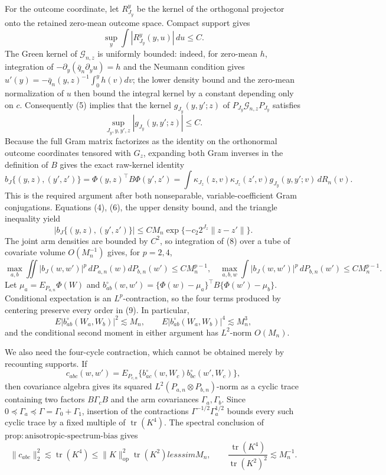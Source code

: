 For the outcome coordinate, let \(R^y_{J_y}\) be the kernel of the orthogonal projector onto the retained zero-mean outcome space.  Compact support gives
\[
\sup_y\int|R^y_{J_y}(y,u)|\,du\le C.
\tag{5}
\]
The Green kernel of \(\mathcal G_{n,z}\) is uniformly bounded: indeed, for zero-mean \(h\), integration of
\(-\partial_y(\bar q_n\partial_yu)=h\) and the Neumann condition gives
\(u'(y)=-\bar q_n(y,z)^{-1}\int_0^yh(v)dv\); the lower density bound and the zero-mean normalization of \(u\) then bound the integral kernel by a constant depending only on \(c\).  Consequently (5) implies that the kernel \(g_{J_y}(y,y';z)\) of \(P_{J_y}\mathcal G_{n,z}P_{J_y}\) satisfies
\[
\sup_{J_y,y,y',z}|g_{J_y}(y,y';z)|\le C.
\tag{6}
\]
Because the full Gram matrix factorizes as the identity on the orthonormal outcome coordinates tensored with \(G_z\), expanding both Gram inverses in the definition of \(B\) gives the exact raw-kernel identity
\[
b_J\{(y,z),(y',z')\}
=\Phi(y,z)^{\top}B\Phi(y',z')
=\int\kappa_{J_z}(z,v)\kappa_{J_z}(z',v)
g_{J_y}(y,y';v)\,dR_n(v).
\tag{7}
\]
This is the required argument after both nonseparable, variable-coefficient Gram conjugations.  Equations (4), (6), the upper density bound, and the triangle inequality yield
\[
|b_J\{(y,z),(y',z')\}|
\le C M_n\exp\{-c_2 2^{J_z}\|z-z'\|\}.
\tag{8}
\]
The joint arm densities are bounded by \(C^2\), so integration of (8) over a tube of covariate volume \(O(M_n^{-1})\) gives, for \(p=2,4\),
\[
\max_{a,b}\iint|b_J(w,w')|^p\,dP_{a,n}(w)dP_{b,n}(w')
\le C M_n^{p-1},
\quad
\max_{a,b,w}\int|b_J(w,w')|^p\,dP_{b,n}(w')
\le C M_n^{p-1}.
\tag{9}
\]
Let \(\mu_a=E_{P_{a,n}}\Phi(W)\) and
\(b_{ab}^{\circ}(w,w')=\{\Phi(w)-\mu_a\}^{\top}B\{\Phi(w')-\mu_b\}\).
Conditional expectation is an \(L^p\)-contraction, so the four terms produced by centering preserve every order in (9).  In particular,
\[
E|b_{ab}^{\circ}(W_a,W_b)|^2\lesssim M_n,
\qquad
E|b_{ab}^{\circ}(W_a,W_b)|^4\lesssim M_n^3,
\tag{10}
\]
and the conditional second moment in either argument has \(L^2\)-norm \(O(M_n)\).

We also need the four-cycle contraction, which cannot be obtained merely by recounting supports.  If
\[
c_{abc}(w,w')=E_{P_{c,n}}
\{b_{ac}^{\circ}(w,W_c)b_{bc}^{\circ}(w',W_c)\},
\]
then covariance algebra gives its squared \(L^2(P_{a,n}\otimes P_{b,n})\)-norm as a cyclic trace containing two factors \(B\Gamma_cB\) and the arm covariances \(\Gamma_a,\Gamma_b\).  Since \(0\preceq\Gamma_a\preceq\Gamma=\Gamma_0+\Gamma_1\), insertion of the contractions \(\Gamma^{-1/2}\Gamma_a^{1/2}\) bounds every such cyclic trace by a fixed multiple of \(\operatorname{tr}(K^4)\).  The spectral conclusion of \(\mathrm{prop{:}anisotropic\text{-}spectrum\text{-}bias}\) gives
\[
\|c_{abc}\|_2^2\lesssim\operatorname{tr}(K^4)
\le\|K\|_{\mathrm{op}}^2\operatorname{tr}(K^2)lesssim M_n,
\qquad
\frac{\operatorname{tr}(K^4)}{\operatorname{tr}(K^2)^2}\lesssim M_n^{-1}.
\tag{11}
\]

